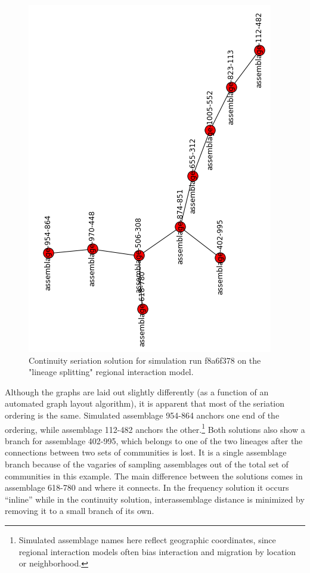 \begin{figure}[ht]
\centering
\includegraphics[scale=0.4]{graphics/multipleseriation/f8a6f378-cont.png}
\caption{Continuity seriation solution for simulation run f8a6f378 on the "lineage splitting" regional interaction model.}
\label{multser:img:differing-cont}
\end{figure}

Although the graphs are laid out slightly differently (as a function of
an automated graph layout algorithm), it is apparent that most of the
seriation ordering is the same. Simulated assemblage 954-864 anchors one
end of the ordering, while assemblage 112-482 anchors the
other.\footnote{Simulated assemblage names here reflect geographic
  coordinates, since regional interaction models often bias interaction
  and migration by location or neighborhood.} Both solutions also show a
branch for assemblage 402-995, which belongs to one of the two lineages
after the connections between two sets of communities is lost. It is a
single assemblage branch because of the vagaries of sampling assemblages
out of the total set of communities in this example. The main difference
between the solutions comes in assemblage 618-780 and where it connects.
In the frequency solution it occurs ``inline'' while in the continuity
solution, interassemblage distance is minimized by removing it to a
small branch of its own.


